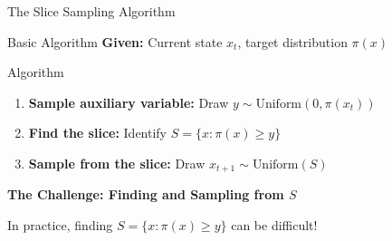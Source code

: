 \begin{frame}{The Slice Sampling Algorithm}
	\begin{block}{Basic Algorithm}
		\textbf{Given:} Current state $x_t$, target distribution $\pi(x)$
	\end{block}
	\begin{block}{Algorithm}
		\begin{enumerate}
			\item \textbf{Sample auxiliary variable:} Draw $y \sim \text{Uniform}(0, \pi(x_t))$
			\item  \textbf{Find the slice:} Identify $S = \{x : \pi(x) \geq y\}$
			\item  \textbf{Sample from the slice:} Draw $x_{t+1} \sim \text{Uniform}(S)$
		\end{enumerate}
	\end{block}

	\vspace{0.3cm}
	\textbf{The Challenge: Finding and Sampling from $S$}

	In practice, finding $S = \{x : \pi(x) \geq y\}$ can be difficult!

\end{frame}

